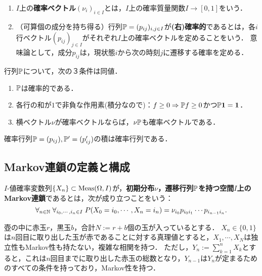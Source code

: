 \documentclass[uplatex,dvipdfmx]{jsreport}
\begin{document}
\begin{definition}\mbox{}
    \begin{enumerate}
        \item $I$上の\textbf{確率ベクトル}$(\nu_i)_{i\in I}$とは，$I$上の確率質量関数$I\to[0,1]$をいう．
        \item （可算個の成分を持ち得る）行列$\mathbb{P}=(p_{ij})_{i,j\in I}$が\textbf{(右)確率的}であるとは，各$i$行ベクトル$(p_{ij})_{j\in I}$がそれぞれ$I$上の確率ベクトルを定めることをいう．
        意味論として，成分$p_{ij}$は，現状態$i$から次の時刻$j$に遷移する確率を定める．
    \end{enumerate}
\end{definition}

\begin{lemma}[確率行列の特徴付け]
    行列$\mathbb{P}$について，次の３条件は同値．
    \begin{enumerate}
        \item $\mathbb{P}$は確率的である．
        \item 各行の和が$1$で非負な作用素(積分なので)：$f\ge0\Rightarrow\mathbb{P} f\ge0$かつ$\mathbb{P}\mathbf{1}=\mathbf{1}$．
        \item 横ベクトル$\nu$が確率ベクトルならば，$\nu\mathbb{P}$も確率ベクトルである．
    \end{enumerate}
\end{lemma}

\begin{lemma}[確率行列は群をなす？]
    確率行列$\mathbb{P}=(p_{ij}),\mathbb{P}'=(p'_{ij})$の積は確率行列である．
\end{lemma}

\subsection{Markov連鎖の定義と構成}

\begin{definition}
    $I$-値確率変数列$\{X_n\}\subset\mathrm{Meas}(\Omega,I)$が，\textbf{初期分布$\nu$，遷移行列$\mathbb{P}$を持つ空間$I$上のMarkov連鎖}であるとは，次が成り立つことをいう：
    \[\forall_{n\in\mathbb{N}}\;\forall_{i_0,\cdots,i_n\in I}\;P(X_0=i_0,\cdots,X_n=i_n)=\nu_{i_0}p_{i_0i_1}\cdots p_{i_{n-1}i_n}.\]
\end{definition}

\begin{example}
    壺の中に赤玉$r$，黒玉$b$，合計$N:=r+b$個の玉が入っているとする．
    $X_n\in\{0,1\}$は$n$回目に取り出した玉が赤であることに対する真理値とすると，$X_1,\cdots,X_N$は独立性もMarkov性も持たない，複雑な相関を持つ．
    ただし，$Y_n:=\sum_{k=1}^nX_k$とすると，これは$n$回目までに取り出した赤玉の総数となり，$Y_{n-1}$は$Y_n$が定まるためのすべての条件を持っており，Markov性を持つ．
\end{example}
\end{document}
